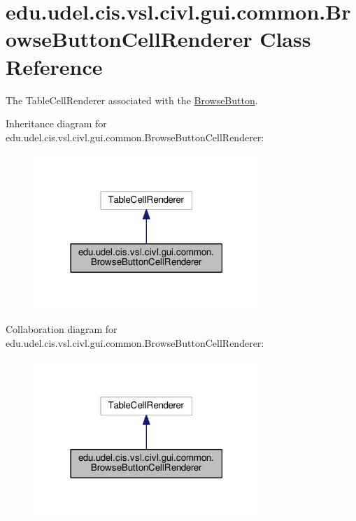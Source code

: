 \hypertarget{classedu_1_1udel_1_1cis_1_1vsl_1_1civl_1_1gui_1_1common_1_1BrowseButtonCellRenderer}{}\section{edu.\+udel.\+cis.\+vsl.\+civl.\+gui.\+common.\+Browse\+Button\+Cell\+Renderer Class Reference}
\label{classedu_1_1udel_1_1cis_1_1vsl_1_1civl_1_1gui_1_1common_1_1BrowseButtonCellRenderer}


The Table\+Cell\+Renderer associated with the \hyperlink{classedu_1_1udel_1_1cis_1_1vsl_1_1civl_1_1gui_1_1common_1_1BrowseButton}{Browse\+Button}.  




Inheritance diagram for edu.\+udel.\+cis.\+vsl.\+civl.\+gui.\+common.\+Browse\+Button\+Cell\+Renderer\+:
\nopagebreak
\begin{figure}[H]
\begin{center}
\leavevmode
\includegraphics[width=242pt]{classedu_1_1udel_1_1cis_1_1vsl_1_1civl_1_1gui_1_1common_1_1BrowseButtonCellRenderer__inherit__graph}
\end{center}
\end{figure}


Collaboration diagram for edu.\+udel.\+cis.\+vsl.\+civl.\+gui.\+common.\+Browse\+Button\+Cell\+Renderer\+:
\nopagebreak
\begin{figure}[H]
\begin{center}
\leavevmode
\includegraphics[width=242pt]{classedu_1_1udel_1_1cis_1_1vsl_1_1civl_1_1gui_1_1common_1_1BrowseButtonCellRenderer__coll__graph}
\end{center}
\end{figure}
